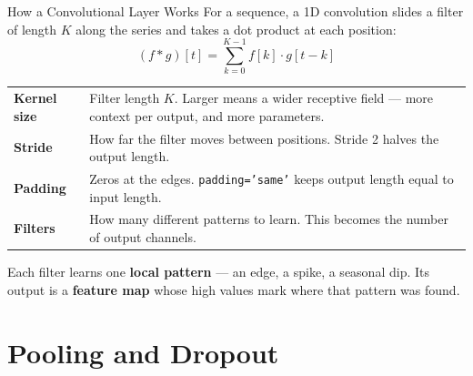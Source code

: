 \documentclass[aspectratio=169, 11pt]{beamer}
\begin{document}
\begin{frame}{How a Convolutional Layer Works}
  For a sequence, a 1D convolution slides a filter of length $K$ along the series and takes a dot
  product at each position:
  \[
    (f * g)[t] = \sum_{k=0}^{K-1} f[k] \cdot g[t - k]
  \]
  \vspace{-0.25cm}
  \begin{center}
    {\small
    \begin{tabular}{p{2.3cm}p{10.1cm}}
      \toprule
      \textbf{Kernel size} & Filter length $K$. Larger means a wider receptive field --- more
      context per output, and more parameters. \\[2pt]
      \textbf{Stride} & How far the filter moves between positions. Stride 2 halves the output
      length. \\[2pt]
      \textbf{Padding} & Zeros at the edges. \texttt{padding='same'} keeps output length equal to
      input length. \\[2pt]
      \textbf{Filters} & How many different patterns to learn. This becomes the number of output
      channels. \\
      \bottomrule
    \end{tabular}
    }
  \end{center}

  Each filter learns one \textbf{local pattern} --- an edge, a spike, a seasonal dip. Its output
  is a \textbf{feature map} whose high values mark where that pattern was found.
\end{frame}

\section{Pooling and Dropout}

\end{document}
